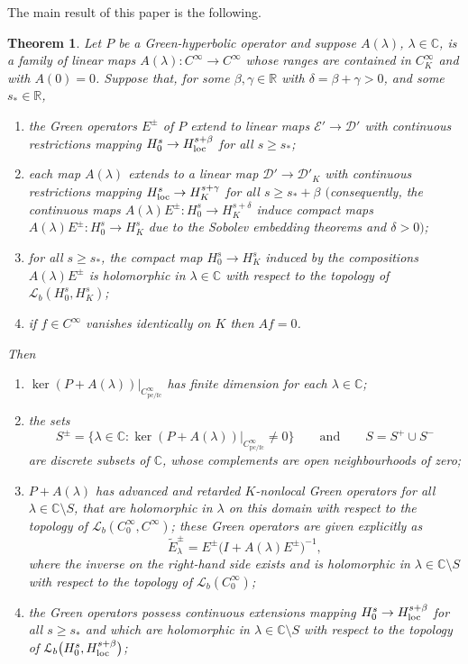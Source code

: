 \documentclass[pdftex]{sigma}
\numberwithin{equation}{section}
\newtheorem{Theorem}{Theorem}[section]
\newcommand{\CC}{{\mathbb C}}
\newcommand{\RR}{{\mathbb R}}
\newcommand{\fc}{\mathrm{fc}}
\newcommand{\pc}{\mathrm{pc}}
\newcommand{\DD}{{\mathscr D}}
\newcommand{\EE}{{\mathscr E}}
\newcommand{\LL}{{\mathcal L}}
\newcommand{\loc}{{\rm loc}}
\begin{document}
 The main result of this paper is the following.
 \begin{Theorem} \label{thm:GHpert}
 	Let $P$ be a Green-hyperbolic operator and
 	suppose $A(\lambda)$, $\lambda\in\CC$, is a family of linear maps $A(\lambda)\colon C^\infty\to C^\infty$ whose ranges are contained in $C^\infty_K$ and with $A(0)=0$. Suppose that,
 	for some $\beta,\gamma\in \RR$ with $\delta=\beta+\gamma>0$, and some $s_*\in \RR$,
 	\begin{enumerate}\itemsep=0pt
 		\item[$(a)$] the Green operators $E^\pm$ of $P$ extend to linear maps
 		$\EE'\to \DD'$ with continuous restrictions mapping $H^s_0\to H^{s+\beta}_\loc$ for all $s\ge s_*$;
 		\item[$(b)$] each map $A(\lambda)$ extends to a linear map $\DD'\to\DD'_K$ with continuous restrictions mapping $H^s_\loc\to H^{s+\gamma}_K$ for all $s\ge s_*+\beta$
 		$($consequently, the continuous maps $A(\lambda)E^\pm\colon H_0^s\to H_K^{s+\delta}$ induce
 		compact maps $A(\lambda)E^\pm\colon H_0^s\to H_K^{s}$ due to the Sobolev embedding theorems and $\delta>0)$;
 		\item[$(c)$] for all $s\ge s_*$, the compact map $H^s_0\to H^s_K$ induced by the compositions $A(\lambda)E^\pm$ is holomorphic in $\lambda\in\CC$ with respect to the topology of $\LL_b(H^s_0,H^s_K)$;
 		\item[$(d)$] if $f\in C^\infty$ vanishes identically on $K$ then $Af=0$.
 	\end{enumerate}
 	Then
 	\begin{enumerate}\renewcommand{\labelenumi}{(\Alph{enumi}).}
 		\item[$(A)$] $\ker (P+ A(\lambda))|_{C^\infty_{\pc/\fc}}$ has finite dimension
 		for each $\lambda\in\CC$;
 		\item[$(B)$]%
 the sets
 		\begin{equation*}
 			S^\pm = \big\{\lambda\in \CC\colon \ker (P+ A(\lambda))|_{C^\infty_{\pc/\fc}}\neq 0\big\} \qquad \text{and}\qquad
 			S = S^+\cup S^-
 		\end{equation*}
 		are discrete subsets of $\CC$, whose complements are open neighbourhoods of zero;
 		\item[$(C)$]%
 $P+A(\lambda)$ has advanced and retarded $K$-nonlocal Green operators for all $\lambda\in\CC\setminus S$, that are holomorphic in $\lambda$ on this domain with respect to the topology of $\LL_b(C_0^\infty, C^\infty)$; these Green operators are given explicitly as
 		\begin{equation*}
 			\tilde{E}_{\lambda}^\pm = E^\pm \big(I+A(\lambda)E^\pm\big)^{-1},
 		\end{equation*}
 		where the inverse on the right-hand side exists and is holomorphic in $\lambda\in \CC\setminus S$
 		with respect to the topology of $\LL_b(C_0^\infty)$;
 		\item[$(D)$]%
 the Green operators
 		possess continuous extensions mapping $H^s_0\to H^{s+\beta}_\loc$ for all $s\ge s_*$ and which are holomorphic in $\lambda\in\CC\setminus S$ with respect to the topology of $\LL_b\big(H^s_0,H^{s+\beta}_\loc\big)$;
 		

\end{enumerate}
\end{Theorem}
\end{document}
